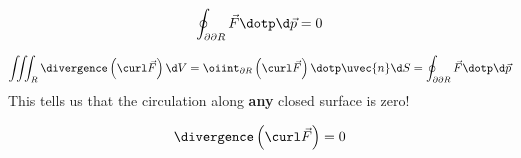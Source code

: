 \documentclass{ximera}
\begin{document}
\[
\oint_{\partial\partial R} \vec{F}\dotp \d \vec{p} = 0
\]


\[
\iiint_R \divergence\left(\curl\vec{F}\right)\d V = \oiint_{\partial R} \left(\curl \vec{F}\right)\dotp \uvec{n} \d S = \oint_{\partial\partial R} \vec{F}\dotp \d \vec{p}
\]
This tells us that the circulation along \textbf{any} closed surface is zero!

\[
\divergence\left(\curl\vec{F}\right) =  0
\]


  
\end{document}
